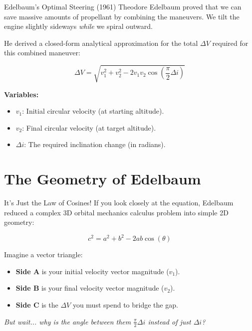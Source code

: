 \documentclass[11pt]{beamer}
\begin{document}
\begin{frame}{Edelbaum's Optimal Steering (1961)}
    Theodore Edelbaum proved that we can save massive amounts of propellant by combining the maneuvers. We tilt the engine slightly sideways \textit{while} we spiral outward.
    
    \vspace{0.3cm}
    He derived a closed-form analytical approximation for the total $\Delta V$ required for this combined maneuver:
    
    \begin{equation}
        \Delta V = \sqrt{v_1^2 + v_2^2 - 2v_1 v_2 \cos\left(\frac{\pi}{2}\Delta i\right)}
    \end{equation}
    
    \vspace{0.3cm}
    \textbf{Variables:}
    \begin{itemize}
        \item $v_1$: Initial circular velocity (at starting altitude).
        \item $v_2$: Final circular velocity (at target altitude).
        \item $\Delta i$: The required inclination change (in radians).
    \end{itemize}
\end{frame}

\section{The Geometry of Edelbaum}

\begin{frame}{It's Just the Law of Cosines!}
    If you look closely at the equation, Edelbaum reduced a complex 3D orbital mechanics calculus problem into simple 2D geometry:
    
    \begin{equation}
        c^2 = a^2 + b^2 - 2ab\cos(\theta)
    \end{equation}
    
    \vspace{0.3cm}
    Imagine a vector triangle:
    \begin{itemize}
        \item \textbf{Side A} is your initial velocity vector magnitude ($v_1$).
        \item \textbf{Side B} is your final velocity vector magnitude ($v_2$).
        \item \textbf{Side C} is the $\Delta V$ you must spend to bridge the gap.
    \end{itemize}
    
    \vspace{0.3cm}
    \textit{But wait... why is the angle between them $\frac{\pi}{2}\Delta i$ instead of just $\Delta i$?}
\end{frame}
\end{document}
